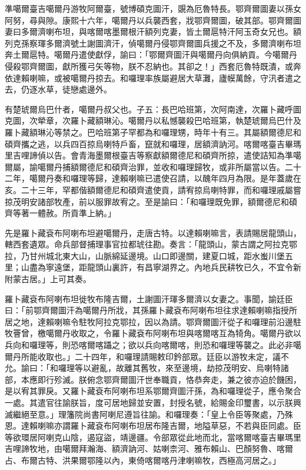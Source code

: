 \begin{pinyinscope}
準噶爾臺吉噶爾丹游牧阿爾臺，號博碩克圖汗，覬為厄魯特長。鄂齊爾圖妻以孫女阿努，尋與隙。康熙十六年，噶爾丹以兵襲西套，戕鄂齊爾圖，破其部。鄂齊爾圖妻曰多爾濟喇布坦，與喀爾喀墨爾根汗額列克妻，皆土爾扈特汗阿玉奇女兄也。額列克孫察琿多爾濟號土謝圖濟汗，偵噶爾丹侵鄂齊爾圖兵援之不及，多爾濟喇布坦奔土爾扈特。噶爾丹遣使獻俘，諭曰：「鄂爾齊圖汗與噶爾丹向俱納貢。今噶爾丹侵殺鄂齊爾圖，獻所獲弓矢等物，朕不忍納也。其卻之！」西套厄魯特既潰，或奔依達賴喇嘛，或被噶爾丹掠去。和囉理率族屬避居大草灘，廬幙萬餘，守汛者遣之去，仍逐水草，徒戀處邊外。

有楚琥爾烏巴什者，噶爾丹叔父也。子五：長巴哈班第，次阿南達，次羅卜藏呼圖克圖，次犖章，次羅卜藏額琳沁。噶爾丹以私憾襲殺巴哈班第，執楚琥爾烏巴什及羅卜藏額琳沁等禁之。巴哈班第子罕都為和囉理甥，時年十有三。其屬額爾德尼和碩齊攜之逃，以兵四百掠烏喇特戶畜，竄就和囉理，居額濟訥河。喀爾喀臺吉畢瑪里吉哩諦偵以告。會青海墨爾根臺吉等察獻額爾德尼和碩齊所掠，遣使詰知為準噶爾屬，諭噶爾丹捕額爾德尼和碩齊治罪，並收和囉理歸牧，或非所屬當以告。二十二年，噶爾丹奏和囉理等歸，達賴喇嘛已遣使召請，以醜年四月為限。是年蓋歲在亥。二十三年，罕都偕額爾德尼和碩齊遣使貢，請宥掠烏喇特罪，而和囉理戚屬嘗掠茂明安諸部牧產，前以服罪故宥之。至是諭曰：「和囉理既免罪，額爾德尼和碩齊等著一體赦。所貢準上納。」

先是羅卜藏袞布阿喇布坦避噶爾丹，走唐古特。以達賴喇嘛言，表請賜居龍頭山，轄西套遺眾。命兵部督捕理事官拉都琥往勘。奏言：「龍頭山，蒙古謂之阿拉克鄂拉，乃甘州城北東大山，山脈綿延邊境。山口即邊關，建夏口城，距水蚩川堡五里；山盡為寧遠堡，距龍頭山裏許，有昌寧湖界之。內地兵民耕牧已久，不宜令新附蒙古居。」上可其奏。

羅卜藏袞布阿喇布坦徙牧布隆吉爾，土謝圖汗琿多爾濟以女妻之。事聞，諭廷臣曰：「前鄂齊爾圖汗為噶爾丹所戕，其孫羅卜藏袞布阿喇布坦往求達賴喇嘛指授所居之地，達賴喇嘛令駐牧阿拉克鄂拉，因以為請。鄂齊爾圖汗從子和囉理前沿邊駐牧罾曾，檄噶爾丹收取之，令羅卜藏袞布阿喇布坦與喀爾喀互為犄角。噶爾丹欲以兵向和囉理等，則恐喀爾喀躡之；欲以兵向喀爾喀，則恐和囉理等襲之。此必非噶爾丹所能收取也。」二十四年，和囉理請賜敕印鈐部眾。廷臣以游牧未定，議不允。諭曰：「和囉理等以避亂，故離其舊牧，來至邊境，劫掠茂明安、烏喇特諸部，本應即行殄滅。朕俯念鄂齊爾圖汗世奉職貢，恪恭奔走，兼之彼亦迫於饑困，是以宥其罪戾。又羅卜藏袞布阿喇布坦系鄂爾齊圖汗孫，為和囉理從子，應令聚合一處。其遣官往諭朕旨，度可居地歸並安置，封授名號，給賜金印璽書，以示朕興滅繼絕至意。」理籓院尚書阿喇尼遵旨往諭。和囉理奏：「皇上令臣等聚處，乃殊恩。達賴喇嘛亦謂羅卜藏袞布阿喇布坦居布隆吉爾，地隘草惡，不若與臣同處。臣等欲環居阿喇克山陰，遏寇盜，靖邊疆。令部眾從此地而北，當喀爾喀臺吉畢瑪里吉哩諦牧地，由噶爾拜瀚海、額濟訥河、姑喇柰河、雅布賴山、巴顏努魯、喀爾占、布爾古特、洪果爾鄂隆以內，東倚喀爾喀丹津喇嘛牧，西極高河居之。」


\end{pinyinscope}
